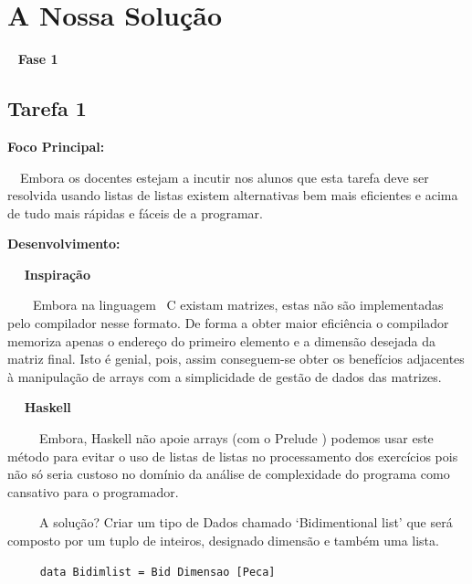 \documentclass[a4paper]{report} %
\begin{document}


\chapter{A Nossa Solução}
\label{sec:solucao}

       \ \textbf{ { \LARGE Fase 1} }
       \vspace{5mm}
   
           \section{Tarefa 1}
         
           \vspace{5mm} 
           \par \textbf{Foco Principal:}
           \par \ \  Embora os docentes estejam a incutir nos alunos que esta tarefa deve ser resolvida usando listas de listas existem alternativas bem mais eficientes e acima de tudo mais rápidas e fáceis de a programar. 
           \vspace{4.5mm} 
           \par \textbf{Desenvolvimento:}
           \par \ \ \textbf{ Inspiração} 
           \par \ \ \ \ Embora na linguagem  C existam matrizes, estas não são implementadas pelo compilador nesse formato. De forma a obter maior eficiência o compilador memoriza apenas o endereço do primeiro elemento e a dimensão desejada da matriz final. Isto é genial, pois, assim conseguem-se obter os benefícios adjacentes à manipulação de arrays com a simplicidade de gestão de dados das matrizes. 
           \vspace{1.7mm} 
           \par \ \ \textbf{ Haskell} 
           \par \ \ \ \ \ Embora, Haskell não apoie arrays (com o Prelude ) podemos usar este método para evitar o uso de listas de listas no processamento dos exercícios pois não só seria custoso no domínio da análise de complexidade do programa como cansativo para o programador. 
           \par \ \ \ \ \ A solução? Criar um tipo de Dados chamado ‘Bidimentional list’ que será composto por um tuplo de inteiros, designado dimensão e também uma lista. 
                    \begin{verbatim}
     data Bidimlist = Bid Dimensao [Peca]
                    \end{verbatim}
\end{document}
